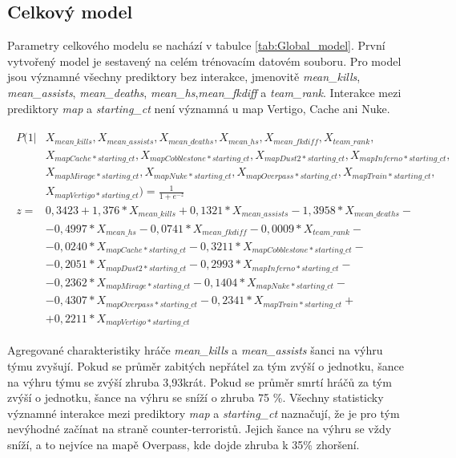 \subsection{Celkový model}



Parametry celkového modelu se nachází v tabulce \ref{tab:Global_model}. První vytvořený model je sestavený na celém trénovacím datovém souboru. Pro model jsou
významné všechny prediktory bez interakce, jmenovitě \textit{mean\_kills}, \textit{mean\_assists}, \textit{mean\_deaths}, \textit{mean\_hs},\textit{mean\_fkdiff} a
\textit{team\_rank}. Interakce mezi prediktory \textit{map} a \textit{starting\_ct} není významná u map Vertigo, Cache ani Nuke.

\begin{align}
    \begin{split}
        P(1 | &X_{mean\_kills}, X_{mean\_assists}, X_{mean\_deaths}, X_{mean\_hs}, X_{mean\_fkdiff}, X_{team\_rank}, \\
              &X_{mapCache*starting\_ct}, X_{mapCobblestone*starting\_ct}, X_{mapDust2*starting\_ct}, X_{mapInferno*starting\_ct}, \\
              &X_{mapMirage*starting\_ct}, X_{mapNuke*starting\_ct}, X_{mapOverpass*starting\_ct}, X_{mapTrain*starting\_ct}, \\
              &X_{mapVertigo*starting\_ct}) = \frac{1}{1 + e^{-z}} \\
        z = &  0,3423 + 1,376*X_{mean\_kills} + 0,1321*X_{mean\_assists} - 1,3958*X_{mean\_deaths} - \\
            &- 0,4997*X_{mean\_hs} - 0,0741*X_{mean\_fkdiff} - 0,0009*X_{team\_rank} - \\
            &- 0,0240*X_{mapCache*starting\_ct} - 0,3211*X_{mapCobblestone*starting\_ct} - \\
            &- 0,2051*X_{mapDust2*starting\_ct} - 0,2993*X_{mapInferno*starting\_ct} - \\
            &- 0,2362*X_{mapMirage*starting\_ct} - 0,1404*X_{mapNuke*starting\_ct} - \\
            &- 0,4307*X_{mapOverpass*starting\_ct} - 0,2341*X_{mapTrain*starting\_ct} + \\
            &+ 0,2211*X_{mapVertigo*starting\_ct}
    \end{split}
\end{align}

Agregované charakteristiky hráče \textit{mean\_kills} a \textit{mean\_assists} šanci na výhru týmu zvyšují. Pokud se průměr zabitých nepřátel za tým zvýší o jednotku,
šance na výhru týmu se zvýší zhruba 3,93krát. Pokud se průměr smrtí hráčů za tým zvýší o jednotku, šance na výhru se sníží o zhruba 75 \%. Všechny statisticky
významné interakce mezi prediktory \textit{map} a \textit{starting\_ct} naznačují, že je pro tým nevýhodné začínat na straně counter-terroristů. Jejich šance
na výhru se vždy sníží, a to nejvíce na mapě Overpass, kde dojde zhruba k 35\% zhoršení.

